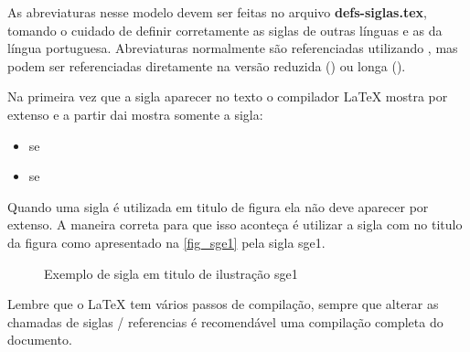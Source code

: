 As abreviaturas nesse modelo devem ser feitas no arquivo \textbf{defs-siglas.tex}, tomando o cuidado de definir corretamente as siglas de outras línguas e as da língua portuguesa. Abreviaturas normalmente são referenciadas utilizando , mas podem ser referenciadas diretamente na versão reduzida  () \space  
ou longa  ().

Na primeira vez que a sigla aparecer no texto o compilador {\LaTeX} mostra por extenso e a partir dai mostra somente a sigla:

\begin{itemize}
    \item \ac{se}
    
    \item \ac{se}
    
\end{itemize}

Quando uma sigla é utilizada em titulo de figura ela não deve aparecer por extenso. A maneira correta para que isso aconteça é utilizar a sigla com  no titulo da figura como apresentado na \autoref{fig_sge1} pela sigla \ac{sge1}.

\begin{figure}[hb]
    \centering
	\caption{\label{fig_sge1}Exemplo de sigla em titulo de ilustração \acs{sge1}}
\end{figure}



Lembre que o {\LaTeX} tem vários passos de compilação, sempre que alterar as chamadas de siglas / referencias é recomendável uma compilação completa do documento.




